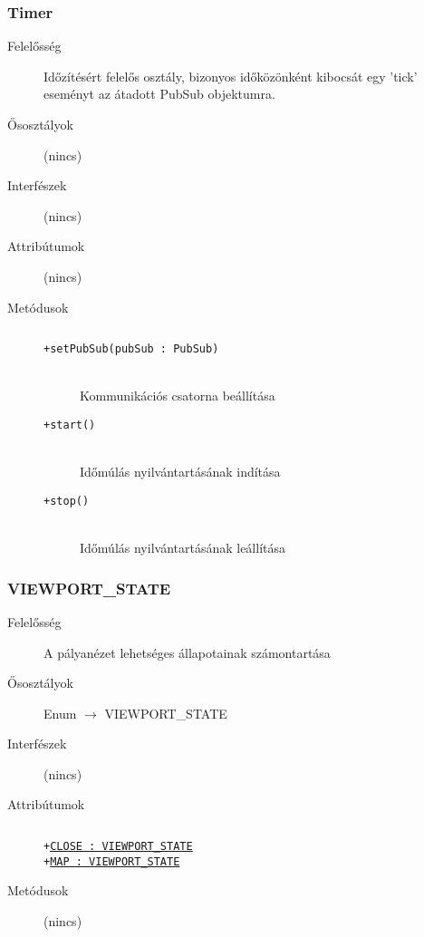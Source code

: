 		\subsubsection{Timer}
			\begin{description}

				\item[Felelősség] Időzítésért felelős osztály, bizonyos időközönként kibocsát egy 'tick' eseményt az átadott PubSub objektumra.

				\item[Ősosztályok] (nincs)
				\item[Interfészek] (nincs)
				\item[Attribútumok] (nincs)
				\item[Metódusok]$\ $
					\begin{description}
						\item[\texttt{+setPubSub(pubSub : PubSub)}] \hfill \\Kommunikációs csatorna beállítása 
						\item[\texttt{+start()}] \hfill \\Időmúlás nyilvántartásának indítása 
						\item[\texttt{+stop()}] \hfill \\Időmúlás nyilvántartásának leállítása 
					\end{description}
			\end{description}

		\subsubsection{VIEWPORT\_STATE}
			\begin{description}

				\item[Felelősség] A pályanézet lehetséges állapotainak számontartása

				\item[Ősosztályok] Enum $\rightarrow{}$ VIEWPORT\_STATE
				\item[Interfészek] (nincs)
				\item[Attribútumok]$\ $
					\begin{description}
						\item[\texttt{+\underline{CLOSE : VIEWPORT\_STATE}}]%
						\item[\texttt{+\underline{MAP : VIEWPORT\_STATE}}]%
					\end{description}
				\item[Metódusok] (nincs)
			\end{description}

